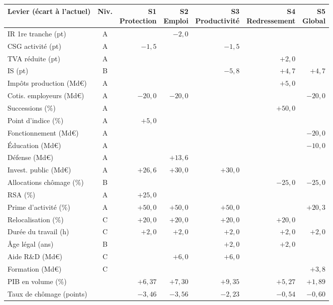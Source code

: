 \begin{tabular}{p{4.8cm}crrrrr}\toprule Levier (écart à l'actuel) & Niv. & \makecell{S1\\ Protection} & \makecell{S2\\ Emploi} & \makecell{S3\\ Productivité} & \makecell{S4\\ Redressement} & \makecell{S5\\ Global}\\ \midrule
IR 1re tranche (pt) & A &  & $-2{,}0$ &  &  & \\
CSG activité (pt) & A & $-1{,}5$ &  & $-1{,}5$ &  & \\
TVA réduite (pt) & A &  &  &  & $+2{,}0$ & \\
IS (pt) & B &  &  & $-5{,}8$ & $+4{,}7$ & $+4{,}7$\\
Impôts production (Md€) & A &  &  &  & $+5{,}0$ & \\
Cotis. employeurs (Md€) & A & $-20{,}0$ & $-20{,}0$ &  &  & $-20{,}0$\\
Successions (\%) & A &  &  &  & $+50{,}0$ & \\
Point d'indice (\%) & A & $+5{,}0$ &  &  &  & \\
Fonctionnement (Md€) & A &  &  &  &  & $-20{,}0$\\
Éducation (Md€) & A &  &  &  &  & $-10{,}0$\\
Défense (Md€) & A &  & $+13{,}6$ &  &  & \\
Invest. public (Md€) & A & $+26{,}6$ & $+30{,}0$ & $+30{,}0$ &  & \\
Allocations chômage (\%) & B &  &  &  & $-25{,}0$ & $-25{,}0$\\
RSA (\%) & A & $+25{,}0$ &  &  &  & \\
Prime d'activité (\%) & A & $+50{,}0$ & $+50{,}0$ & $+50{,}0$ &  & $+20{,}3$\\
Relocalisation (\%) & C & $+20{,}0$ & $+20{,}0$ & $+20{,}0$ & $+20{,}0$ & \\
Durée du travail (h) & C & $+2{,}0$ & $+2{,}0$ & $+2{,}0$ & $+2{,}0$ & $+2{,}0$\\
Âge légal (ans) & B &  &  & $+2{,}0$ & $+2{,}0$ & \\
Aide R\&D (Md€) & C &  & $+6{,}0$ & $+6{,}0$ &  & \\
Formation (Md€) & C &  &  &  &  & $+3{,}8$\\
\midrule
PIB en volume (\%) & & $+6{,}37$ & $+7{,}30$ & $+9{,}35$ & $+5{,}27$ & $+1{,}89$\\
Taux de chômage (points) & & $-3{,}46$ & $-3{,}56$ & $-2{,}23$ & $-0{,}54$ & $-0{,}60$\\

\end{tabular}
